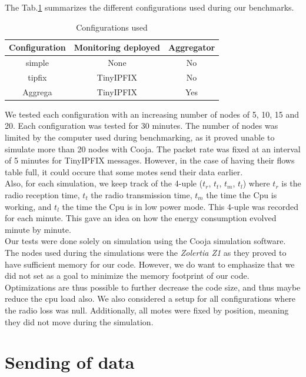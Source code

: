 The Tab.\ref{table:configurations} summarizes the different configurations used during our benchmarks. \\

\begin{table}
  \centering
  \begin{tabular}{|c|c|c|}
    \hline
    Configuration & Monitoring deployed & Aggregator \\
    \hline
    simple & None & No \\
    \hline
    tipfix & TinyIPFIX & No \\
    \hline
    Aggrega & TinyIPFIX & Yes \\
    \hline
  \end{tabular}
  \caption{Configurations used}
  \label{table:configurations}
\end{table}

We tested each configuration with an increasing number of nodes of 5, 10, 15 and 20. Each configuration was tested for 30 minutes. The number of nodes was limited by the computer used during benchmarking, as it proved unable to simulate more than 20 nodes with Cooja. The packet rate was fixed at an interval of 5 minutes for TinyIPFIX messages. However, in the case of having their flows table full, it could occure that some motes send their data earlier.\\

Also, for each simulation, we keep track of the 4-uple ($t_r$, $t_t$, $t_m$, $t_l$) where $t_r$ is the radio reception time, $t_t$ the radio transmission time, $t_m$ the time the Cpu is working, and $t_l$ the time the Cpu is in low power mode. This 4-uple was recorded for each minute. This gave an idea on how the energy consumption evolved minute by minute.\\

Our tests were done solely on simulation using the Cooja simulation software. The nodes used during the simulations were the \textit{Zolertia Z1} as they proved to have sufficient memory for our code. However, we do want to emphasize that we did not set as a goal to minimize the memory footprint of our code. Optimizations are thus possible to further decrease the code size, and thus maybe reduce the cpu load also. We also considered a setup for all configurations where the radio loss was null. Additionally, all motes were fixed by position, meaning they did not move during the simulation.

\section{Sending of data}

